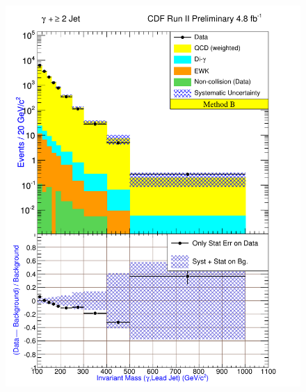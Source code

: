 \begin{figure}[h!]
{\includegraphics[keepaspectratio=true, scale=\resultsHistScale]{G30Jets_MtdB_plot2_InvMass_pj1.pdf}}

\end{figure}
